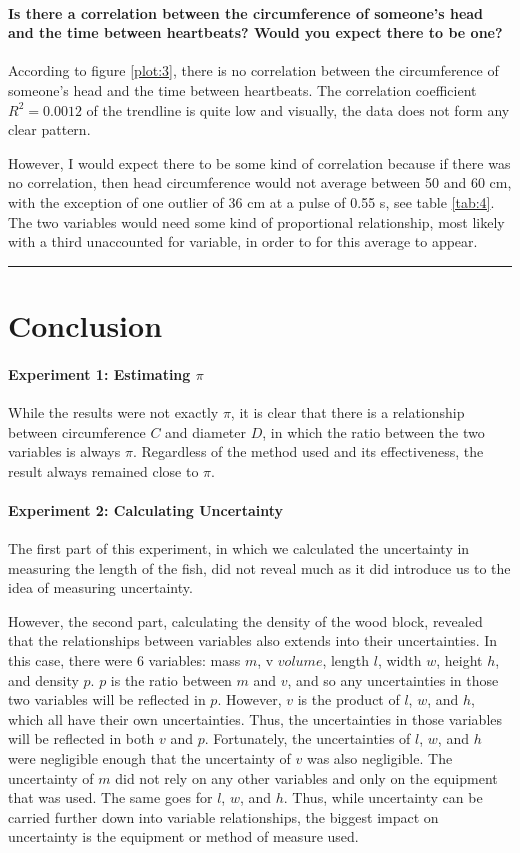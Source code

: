\documentclass{article}
\begin{document}
\paragraph*{\numberQ Is there a correlation between the circumference
of someone's head and the time between heartbeats? Would you 
expect there to be one?}
According to figure \ref{plot:3}, there is no correlation between the circumference 
of someone's head and the time between heartbeats. The correlation coefficient 
$R^2=0.0012$ of the trendline is quite low and visually, the data does not form any 
clear pattern.

However, I would expect there to be some kind of correlation because if there was no 
correlation, then head circumference would not average between 50 and 60 cm, with the 
exception of one outlier of 36 cm at a pulse of 0.55 s, see table \ref{tab:4}. 
The two variables would need some kind of proportional relationship, most likely 
with a third unaccounted for variable, in order to for this average to appear.

\vspace{1em}
\hrule
\vspace{1em}
\section{Conclusion}
\paragraph {Experiment 1: Estimating $\pi$} While the results were not exactly $\pi$,
it is clear that there is a relationship between circumference $C$ and diameter $D$,
in which the ratio between the two variables is always $\pi$. Regardless of the method 
used and its effectiveness, the result always remained close to $\pi$.

\paragraph{Experiment 2: Calculating Uncertainty} The first part of this experiment, in 
which we calculated the uncertainty in measuring the length of the fish, did not reveal
much as it did introduce us to the idea of measuring uncertainty.

However, the second part, calculating the density of the wood block, revealed that the 
relationships between variables also extends into their uncertainties. In this case, 
there were 6 variables: mass $m$, v $volume$, length $l$, width $w$, height $h$, and 
density $p$. $p$ is the ratio between $m$ and $v$, and so any uncertainties in those 
two variables will be reflected in $p$. However, $v$ is the product of $l$, $w$, and $h$, 
which all have their own uncertainties. Thus, the uncertainties in those variables will 
be reflected in both $v$ and $p$. Fortunately, the uncertainties of $l$, $w$, and $h$ were 
negligible enough that the uncertainty of $v$ was also negligible. The uncertainty of $m$ 
did not rely on any other variables and only on the equipment that was used. The same goes 
for $l$, $w$, and $h$. Thus, while uncertainty can be carried further down into variable 
relationships, the biggest impact on uncertainty is the equipment or method of measure used. 
\end{document}
